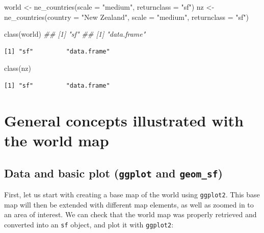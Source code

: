 \documentclass[
  letterpaper,
  DIV=11,
  numbers=noendperiod]{scrartcl}
\newenvironment{Shaded}{\begin{snugshade}}{\end{snugshade}}
\newcommand{\AttributeTok}[1]{\textcolor[rgb]{0.40,0.45,0.13}{#1}}
\newcommand{\DocumentationTok}[1]{\textcolor[rgb]{0.37,0.37,0.37}{\textit{#1}}}
\newcommand{\FunctionTok}[1]{\textcolor[rgb]{0.28,0.35,0.67}{#1}}
\newcommand{\NormalTok}[1]{\textcolor[rgb]{0.00,0.23,0.31}{#1}}
\newcommand{\OtherTok}[1]{\textcolor[rgb]{0.00,0.23,0.31}{#1}}
\newcommand{\StringTok}[1]{\textcolor[rgb]{0.13,0.47,0.30}{#1}}
\begin{document}
\begin{Shaded}
\begin{Highlighting}[]
\NormalTok{world }\OtherTok{\textless{}{-}} \FunctionTok{ne\_countries}\NormalTok{(}\AttributeTok{scale =} \StringTok{"medium"}\NormalTok{, }\AttributeTok{returnclass =} \StringTok{"sf"}\NormalTok{) }
\NormalTok{nz }\OtherTok{\textless{}{-}} \FunctionTok{ne\_countries}\NormalTok{(}\AttributeTok{country =} \StringTok{"New Zealand"}\NormalTok{, }\AttributeTok{scale =} \StringTok{"medium"}\NormalTok{, }\AttributeTok{returnclass =} \StringTok{"sf"}\NormalTok{)}

\FunctionTok{class}\NormalTok{(world)  }\DocumentationTok{\#\# [1] "sf"   \#\# [1] "data.frame" }
\end{Highlighting}
\end{Shaded}

\begin{verbatim}
[1] "sf"         "data.frame"
\end{verbatim}

\begin{Shaded}
\begin{Highlighting}[]
\FunctionTok{class}\NormalTok{(nz)}
\end{Highlighting}
\end{Shaded}

\begin{verbatim}
[1] "sf"         "data.frame"
\end{verbatim}

\hypertarget{general-concepts-illustrated-with-the-world-map}{%
\section{General concepts illustrated with the world
map}\label{general-concepts-illustrated-with-the-world-map}}

\hypertarget{data-and-basic-plot-ggplot-and-geom_sf}{%
\subsection{\texorpdfstring{Data and basic plot (\texttt{ggplot} and
\texttt{geom\_sf})}{Data and basic plot (ggplot and geom\_sf)}}\label{data-and-basic-plot-ggplot-and-geom_sf}}

First, let us start with creating a base map of the world using
\texttt{ggplot2}. This base map will then be extended with different map
elements, as well as zoomed in to an area of interest. We can check that
the world map was properly retrieved and converted into an \texttt{sf}
object, and plot it with \texttt{ggplot2}:
\end{document}
